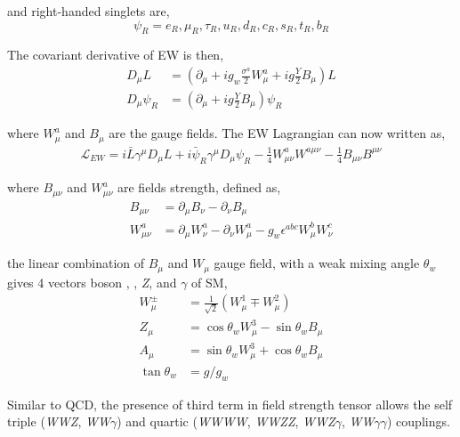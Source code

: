 and right-handed singlets are,
%
\begin{equation}
  \psi_R = e_R, \mu_R, \tau_R, u_R, d_R, c_R, s_R, t_R, b_R
\end{equation}

The covariant
derivative of \gls{EW} is then,
%
\begin{align} \label{eq:ew-dmu}
  D_{\mu} L      & = \left( \partial_{\mu} + i g_w \frac{\sigma^{a}}{2} W^{a}_{\mu} + i g \frac{Y}{2} B_{\mu} \right) L \\
  D_{\mu} \psi_R & = \left( \partial_{\mu} + i g \frac{Y}{2} B_{\mu} \right) \psi_R
\end{align}

where \( W^{a}_{\mu} \) and \( B_{\mu} \) are the gauge fields. The \gls{EW}
Lagrangian can now written as,
%
\begin{align}
  \mathcal{L}_{EW} = i \bar{L} \gamma^{\mu} D_{\mu} L
  + i \bar{\psi}_R \gamma^{\mu} D_{\mu} \psi_R
  - \frac{1}{4} {W}_{\mu \nu}^{a} {W}^{a \mu \nu}
  - \frac{1}{4} {B}_{\mu \nu} {B}^{\mu \nu}
\end{align}

where \( B_{\mu \nu} \) and \( W^{a}_{\mu \nu} \) are fields strength,
defined as,
%
\begin{align}
  B_{\mu \nu }    & = \partial_{\mu} B_{\nu} - \partial_{\nu} B_{\mu}         \\
  W_{\mu \nu}^{a} & = \partial_{\mu} W_{\nu}^{a} - \partial_{\nu} W_{\mu}^{a}
  - g_w \epsilon^{abc} W_{\mu}^{b} W_{\nu}^{c}
\end{align}

the linear combination of \( B_{\mu} \) and \( W_{\mu} \) gauge field, with a weak mixing
angle \( \theta_w \) gives 4 vectors boson \Wplus, \Wminus, \textit{Z}, and \( \gamma \) of \gls{SM},
%
\begin{align}
  W^{\pm}_{\mu} & = \frac{1}{\sqrt{2}} \left( W^{1}_{\mu} \mp W^{2}_{\mu} \right) \\
  Z_{\mu}       & = \cos \theta_w W^{3}_{\mu} - \sin \theta_w B_{\mu}             \\
  A_{\mu}       & = \sin \theta_w W^{3}_{\mu} + \cos \theta_w B_{\mu}             \\
  \tan \theta_w & = g/g_{w}
\end{align}

Similar to \gls{QCD}, the presence of third term in field strength tensor
allows the self triple (\textit{WWZ}, \textit{WW}\( \gamma \)) and quartic (\textit{WWWW},
\textit{WWZZ}, \textit{WWZ}\( \gamma \),
\textit{WW}\( \gamma \gamma \)) couplings.

